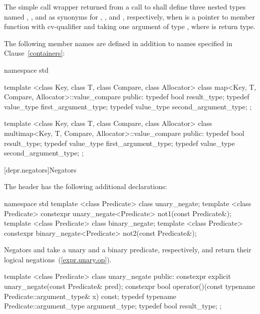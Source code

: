 \pnum
The simple call wrapper
returned from a call to 
shall define three nested types
named , , and 
as synonyms for \cv{} , , and , respectively,
when  is a pointer to member function
with cv-qualifier \cv{}
and taking one argument of type ,
where  is  return type.

\pnum
The following member names are defined in addition to names specified in Clause~\ref{containers}:

%
%
%
\begin{codeblock}
namespace std {
  template <class Key, class T, class Compare, class Allocator>
  class map<Key, T, Compare, Allocator>::value_compare {
  public:
    typedef bool result_type;
    typedef value_type first_argument_type;
    typedef value_type second_argument_type;
  };

  template <class Key, class T, class Compare, class Allocator>
  class multimap<Key, T, Compare, Allocator>::value_compare {
  public:
    typedef bool result_type;
    typedef value_type first_argument_type;
    typedef value_type second_argument_type;
  };
}
\end{codeblock}

[depr.negators]{Negators}

\pnum
The header  has the following additional declarations:

\begin{codeblock}
namespace std {
  template <class Predicate> class unary_negate;
  template <class Predicate>
    constexpr unary_negate<Predicate> not1(const Predicate&);
  template <class Predicate> class binary_negate;
  template <class Predicate>
    constexpr binary_negate<Predicate> not2(const Predicate&);
}
\end{codeblock}

\pnum
Negators  and 
take a unary and a binary predicate, respectively,
and return their logical negations~(\ref{expr.unary.op}).

%
\begin{codeblock}
template <class Predicate>
class unary_negate {
public:
  constexpr explicit unary_negate(const Predicate& pred);
  constexpr bool operator()(const typename Predicate::argument_type& x) const;
  typedef typename Predicate::argument_type argument_type;
  typedef bool result_type;
};
\end{codeblock}

